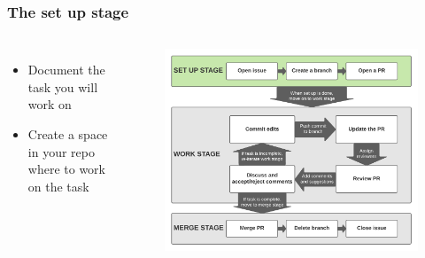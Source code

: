 \documentclass[aspectratio=169]{beamer} %
\begin{document}
\begin{frame}
	\frametitle{The set up stage}
	
	\begin{columns}[c]
		
		
		\begin{itemize}
			\setlength\itemsep{1em}
			\item Document the task you will work on
			\item Create a space in your repo where to work on the task
		\end{itemize}
		
		\vspace{-.75cm}
		\begin{figure}
			\centering
			\includegraphics[width=\textwidth]{./img/branch-pr-merge-cycle-S1.png}
		\end{figure}
		
	\end{columns}
\end{frame}
\end{document}
